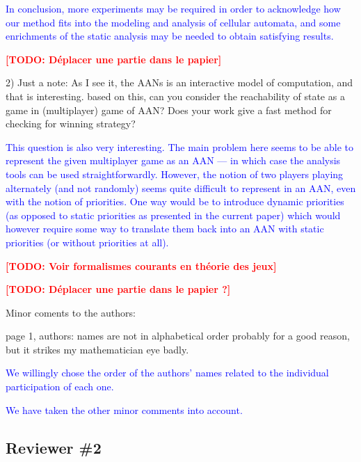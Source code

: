 \documentclass[11pt]{article}
\newcommand{\todo}[1]{\textcolor{red}{\textbf{[TODO: #1]}}}
\newcommand{\ilanswer}[1]{\textcolor{blue}{#1}}
\newcommand{\answer}[1]{\ilanswer{#1}\vspace*{1em}}
\begin{document}
\answer{In conclusion,
more experiments may be required in order to acknowledge how our method fits into the modeling and analysis of cellular automata,
and some enrichments of the static analysis may be needed to obtain satisfying results.
}

\todo{Déplacer une partie dans le papier}



2) Just a note: As I see it, the AANs is an interactive model of computation, and that is interesting. based on this, can you consider the reachability of state as a game in (multiplayer) game of AAN? Does  your work give a fast method for checking for winning strategy?   

\answer{This question is also very interesting.
The main problem here seems to be able to represent the given multiplayer game as an AAN ---
in which case the analysis tools can be used straightforwardly.
However, the notion of two players playing alternately (and not randomly) seems quite difficult
to represent in an AAN, even with the notion of priorities.
One way would be to introduce dynamic priorities (as opposed to static priorities as presented in the current paper) which would however require some way to translate them back into an AAN with static priorities (or without priorities at all).
}

\todo{Voir formalismes courants en théorie des jeux}

\todo{Déplacer une partie dans le papier ?}



Minor coments to the authors:

page 1, authors: names are not in alphabetical order probably for a good reason, but it strikes my mathematician eye badly.

\answer{We willingly chose the order of the authors' names related to the individual participation of each one.}

\answer{We have taken the other minor comments into account.}






\subsection*{Reviewer \#2}
\end{document}

